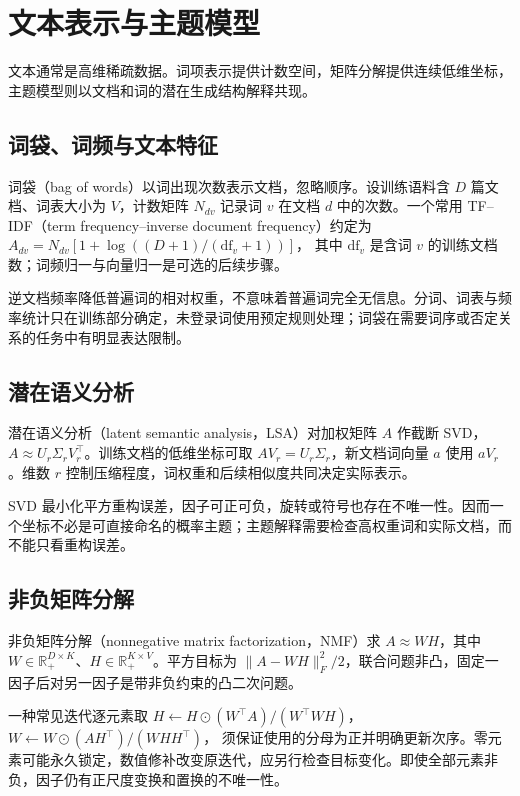 \setcounter{chapter}{20} %
\chapter{文本表示与主题模型}
\label{chap:ml-text}

文本通常是高维稀疏数据。词项表示提供计数空间，矩阵分解提供连续低维坐标，主题模型则以文档和词的潜在生成结构解释共现。

\section{词袋、词频与文本特征}

词袋（bag of words）以词出现次数表示文档，忽略顺序。设训练语料含 $D$ 篇文档、词表大小为 $V$，计数矩阵 $N_{dv}$ 记录词 $v$ 在文档 $d$ 中的次数。一个常用 TF--IDF（term frequency--inverse document frequency）约定为
$A_{dv}=N_{dv}[1+\log((D+1)/(\mathrm{df}_v+1))]$，
其中 $\mathrm{df}_v$ 是含词 $v$ 的训练文档数；词频归一与向量归一是可选的后续步骤。

逆文档频率降低普遍词的相对权重，不意味着普遍词完全无信息。分词、词表与频率统计只在训练部分确定，未登录词使用预定规则处理；词袋在需要词序或否定关系的任务中有明显表达限制。

\section{潜在语义分析}

潜在语义分析（latent semantic analysis，LSA）对加权矩阵 $A$ 作截断 SVD，$A\approx U_r\Sigma_rV_r^\top$。训练文档的低维坐标可取 $AV_r=U_r\Sigma_r$，新文档词向量 $a$ 使用 $aV_r$。维数 $r$ 控制压缩程度，词权重和后续相似度共同决定实际表示。

SVD 最小化平方重构误差，因子可正可负，旋转或符号也存在不唯一性。因而一个坐标不必是可直接命名的概率主题；主题解释需要检查高权重词和实际文档，而不能只看重构误差。

\section{非负矩阵分解}

非负矩阵分解（nonnegative matrix factorization，NMF）求 $A\approx WH$，其中 $W\in\mathbb R_+^{D\times K}$、$H\in\mathbb R_+^{K\times V}$。平方目标为 $\|A-WH\|_F^2/2$，联合问题非凸，固定一因子后对另一因子是带非负约束的凸二次问题。

一种常见迭代逐元素取
$H\leftarrow H\odot(W^\top A)/(W^\top WH)$，
$W\leftarrow W\odot(AH^\top)/(WHH^\top)$，
须保证使用的分母为正并明确更新次序。零元素可能永久锁定，数值修补改变原迭代，应另行检查目标变化。即使全部元素非负，因子仍有正尺度变换和置换的不唯一性。

